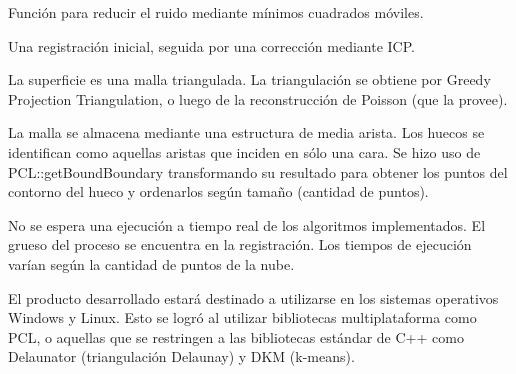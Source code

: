 \documentclass{pfc}
\begin{document}
		Función para reducir el ruido mediante mínimos cuadrados móviles.

		Una registración inicial, seguida por una corrección mediante ICP.

		La superficie es una malla triangulada. La triangulación se obtiene por Greedy Projection Triangulation, o luego de la reconstrucción de Poisson (que la provee).


		La malla se almacena mediante una estructura de media arista. Los
		huecos se identifican como aquellas aristas que inciden en sólo una
		cara.
		Se hizo uso de PCL::getBoundBoundary transformando su resultado para
		obtener los puntos del contorno del hueco y ordenarlos según tamaño
		(cantidad de puntos).



	{No se espera una ejecución a tiempo real de los algoritmos implementados.}
		El grueso del proceso se encuentra en la registración.
		Los tiempos de ejecución varían según la cantidad de puntos de la nube.

	{El producto desarrollado estará destinado a utilizarse en los sistemas
	operativos Windows y Linux.}
		Esto se logró al utilizar bibliotecas multiplataforma como PCL,
		o aquellas que se restringen a las bibliotecas estándar de C++ como Delaunator (triangulación Delaunay) y DKM (k-means).

	
	
\end{document}
